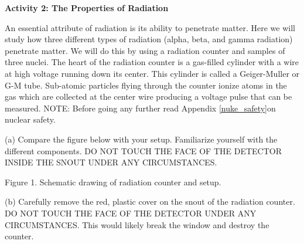 
\textbf{Activity 2: The Properties of Radiation}

An essential attribute of radiation is its ability to penetrate
matter.
Here we will study how three different types of radiation (alpha, beta,
and gamma radiation) penetrate matter. We will do this by using a radiation counter
 and samples of three nuclei.
The heart of the radiation counter is a gas-filled cylinder with a wire at
high voltage running down its center.
This cylinder is called a Geiger-Muller or G-M tube.
Sub-atomic particles flying through the counter ionize atoms in the gas which are 
collected at the center wire producing a voltage pulse that can be measured.
NOTE: Before going any further read Appendix \ref{nuke_safety}on nuclear safety.

(a) Compare the figure below with your setup. Familiarize yourself with the
different components. DO NOT TOUCH THE FACE OF THE DETECTOR INSIDE
THE SNOUT UNDER ANY CIRCUMSTANCES.

\vspace{0.3cm}
{\centering {} \par}
{\centering Figure 1. Schematic drawing of radiation counter and setup. \par}
\vspace{0.3cm}

(b) Carefully remove the red, plastic cover on the snout of the radiation counter.
DO NOT TOUCH THE FACE OF THE DETECTOR UNDER ANY CIRCUMSTANCES. This would likely
break the window and destroy the counter.

